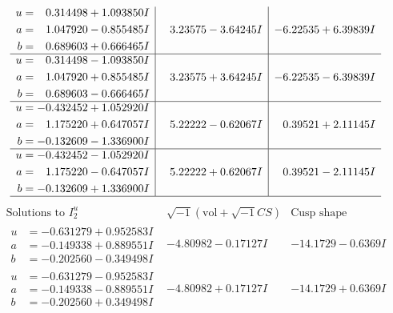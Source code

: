 \documentclass[1p]{elsarticle_modified}
\theoremstyle{definition}
\newcommand{\I}{\sqrt{-1}}
\begin{document}
$$\begin{array}{c|c|c}
\begin{aligned}
u &= \phantom{-}0.314498 + 1.093850 I \\
a &= \phantom{-}1.047920 - 0.855485 I \\
b &= \phantom{-}0.689603 + 0.666465 I\end{aligned}
 & \phantom{-}3.23575 - 3.64245 I & -6.22535 + 6.39839 I \\ \hline\begin{aligned}
u &= \phantom{-}0.314498 - 1.093850 I \\
a &= \phantom{-}1.047920 + 0.855485 I \\
b &= \phantom{-}0.689603 - 0.666465 I\end{aligned}
 & \phantom{-}3.23575 + 3.64245 I & -6.22535 - 6.39839 I \\ \hline\begin{aligned}
u &= -0.432452 + 1.052920 I \\
a &= \phantom{-}1.175220 + 0.647057 I \\
b &= -0.132609 - 1.336900 I\end{aligned}
 & \phantom{-}5.22222 - 0.62067 I & \phantom{-}0.39521 + 2.11145 I \\ \hline\begin{aligned}
u &= -0.432452 - 1.052920 I \\
a &= \phantom{-}1.175220 - 0.647057 I \\
b &= -0.132609 + 1.336900 I\end{aligned}
 & \phantom{-}5.22222 + 0.62067 I & \phantom{-}0.39521 - 2.11145 I\\
 \hline 
 \end{array}$$\newpage$$\begin{array}{c|c|c}  
\text{Solutions to }I^u_{2}& \I (\text{vol} + \sqrt{-1}CS) & \text{Cusp shape}\\
 \hline 
\begin{aligned}
u &= -0.631279 + 0.952583 I \\
a &= -0.149338 + 0.889551 I \\
b &= -0.202560 - 0.349498 I\end{aligned}
 & -4.80982 - 0.17127 I & -14.1729 - 0.6369 I \\ \hline\begin{aligned}
u &= -0.631279 - 0.952583 I \\
a &= -0.149338 - 0.889551 I \\
b &= -0.202560 + 0.349498 I\end{aligned}
 & -4.80982 + 0.17127 I & -14.1729 + 0.6369 I \\ \hline\begin{aligned}

\end{aligned}
\end{array}$$
\end{document}
